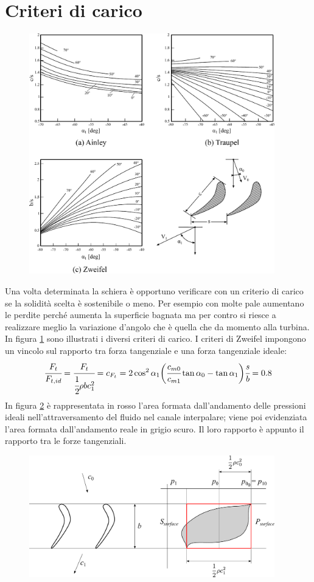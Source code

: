 \section{Criteri di carico}
\begin{figure}[h!]
\centering
  \includegraphics[width=0.95\textwidth]{fig/Ainley.pdf}
\caption{}
\label{fig:Ainley}
\end{figure}
Una volta determinata la schiera è opportuno verificare con un criterio di carico se la solidità scelta è sostenibile o meno. Per esempio con molte pale aumentano le perdite perché aumenta la superficie bagnata ma per contro si riesce a realizzare meglio la variazione d'angolo che è quella che da momento alla turbina.\\
In figura \ref{fig:Ainley} sono illustrati i diversi criteri di carico. I criteri di Zweifel impongono un vincolo sul rapporto tra forza tangenziale e una forza tangenziale ideale:
\begin{align*}
\cfrac{F_t}{F_{t,id}} = \cfrac{F_t}{\cfrac{1}{2} \rho b c_1^2} = c_{F_t} = 2 \cos^2 \alpha_1 \bigg(\cfrac{c_{m0}}{c_{m1}} \tan \alpha_0 - \tan \alpha_1 \bigg) \cfrac{s}{b} = 0.8
\end{align*}
In figura \ref{fig:CritCaricoT} è rappresentata in rosso l'area formata dall'andamento delle pressioni ideali nell'attraversamento del fluido nel canale interpalare; viene poi evidenziata l'area formata dall'andamento reale in grigio scuro. Il loro rapporto è appunto il rapporto tra le forze tangenziali.
\begin{figure}[h!]
\centering
  \includegraphics[width=0.95\textwidth]{fig/CritCaricoT.pdf}
\caption{}
\label{fig:CritCaricoT}
\end{figure}
